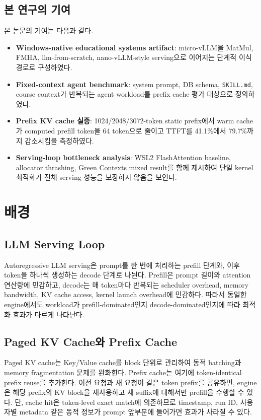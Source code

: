 \documentclass{kcc}
\begin{document}
\subsection{본 연구의 기여}
본 논문의 기여는 다음과 같다.
\begin{itemize}
\item \textbf{Windows-native educational systems artifact}: micro-vLLM을 MatMul, FMHA, llm-from-scratch, nano-vLLM-style serving으로 이어지는 단계적 이식 경로로 구성하였다.
\item \textbf{Fixed-context agent benchmark}: system prompt, DB schema, \texttt{SKILL.md}, course context가 반복되는 agent workload를 prefix cache 평가 대상으로 정의하였다.
\item \textbf{Prefix KV cache 실증}: 1024/2048/3072-token static prefix에서 warm cache가 computed prefill token을 64 token으로 줄이고 TTFT를 41.1\%에서 79.7\%까지 감소시킴을 측정하였다.
\item \textbf{Serving-loop bottleneck analysis}: WSL2 FlashAttention baseline, allocator thrashing, Green Contexts mixed result를 함께 제시하여 단일 kernel 최적화가 전체 serving 성능을 보장하지 않음을 보인다.
\end{itemize}

\section{배경}
\subsection{LLM Serving Loop}
Autoregressive LLM serving은 prompt를 한 번에 처리하는 prefill 단계와, 이후 token을 하나씩 생성하는 decode 단계로 나뉜다. Prefill은 prompt 길이와 attention 연산량에 민감하고, decode는 매 token마다 반복되는 scheduler overhead, memory bandwidth, KV cache access, kernel launch overhead에 민감하다. 따라서 동일한 engine에서도 workload가 prefill-dominated인지 decode-dominated인지에 따라 최적화 효과가 다르게 나타난다.

\subsection{Paged KV Cache와 Prefix Cache}
Paged KV cache는 Key/Value cache를 block 단위로 관리하여 동적 batching과 memory fragmentation 문제를 완화한다. Prefix cache는 여기에 token-identical prefix reuse를 추가한다. 이전 요청과 새 요청이 같은 token prefix를 공유하면, engine은 해당 prefix의 KV block을 재사용하고 새 suffix에 대해서만 prefill을 수행할 수 있다. 단, cache hit은 token-level exact match에 의존하므로 timestamp, run ID, 사용자별 metadata 같은 동적 정보가 prompt 앞부분에 들어가면 효과가 사라질 수 있다.
\end{document}
